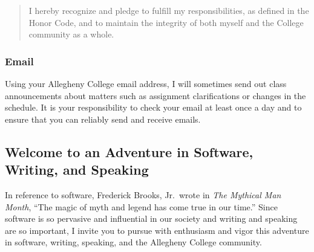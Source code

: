 \vspace*{-.125in}
\begin{quote}
I hereby recognize and pledge to fulfill my responsibilities, as defined in the Honor Code, and to maintain the
integrity of both myself and the College community as a whole.  
\end{quote}
\vspace*{-.175in}

\subsubsection*{Email}

Using your Allegheny College email address, I will sometimes send out class announcements about matters such as
assignment clarifications or changes in the schedule. It is your responsibility to check your email at least once a day
and to ensure that you can reliably send and receive emails.

\subsection*{Welcome to an Adventure in Software, Writing, and Speaking}

In reference to software, Frederick Brooks, Jr.\ wrote in {\em The Mythical Man Month}, ``The magic of myth and legend has come
true in our time.'' Since software is so pervasive and influential in our society and writing and speaking are so important,
I invite you to pursue with enthusiasm and vigor this adventure in software, writing, speaking, and the Allegheny
College community.





% 


